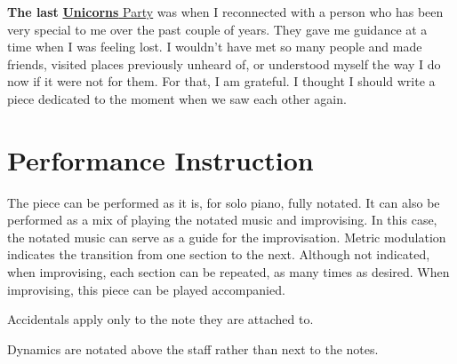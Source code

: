 \documentclass{article}
\begin{document}
\textbf{The last}
\href{https://www.unicornsparty.com/}{\textbf{Unicorns} Party} was when
I reconnected with a person who has been very special to me over the
past couple of years. They gave me guidance at a time when I was feeling
lost. I wouldn’t have met so many people and made friends, visited
places previously unheard of, or understood myself the way I do now if
it were not for them. For that, I am grateful. I thought I should write
a piece dedicated to the moment when we saw each other again.

\section*{Performance Instruction}
The piece can be performed as it is, for solo piano, fully notated.
%
It can also be performed as a mix of playing the notated music and
improvising.
%
In this case, the notated music can serve as a guide for the
improvisation.
%
Metric modulation indicates the transition from one section to the next.
Although not indicated, when improvising, each section can be repeated,
as many times as desired.
%
When improvising, this piece can be played accompanied.

\noindent
Accidentals apply only to the note they are attached to.

\noindent
Dynamics are notated above the staff rather than next to the notes.
\end{document}
